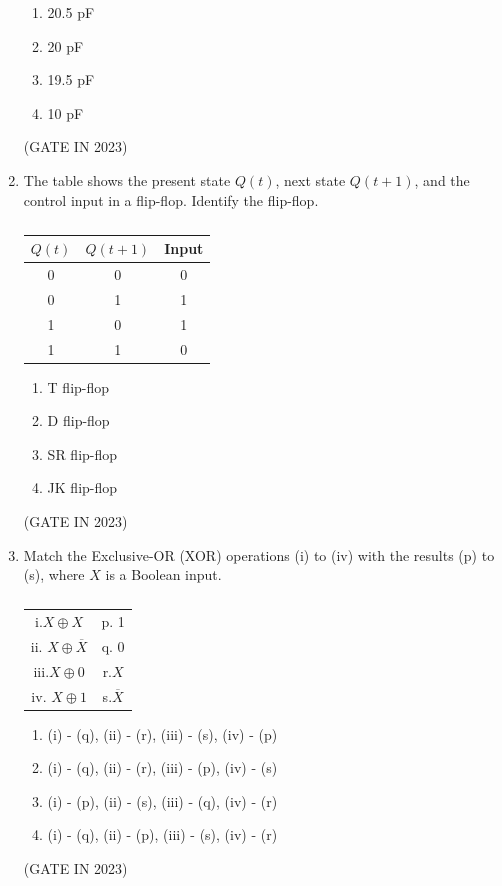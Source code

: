 \documentclass[journal]{IEEEtran}
\begin{document}
\begin{enumerate}
    \begin{enumerate}
        \item 20.5 pF
        \item 20 pF
        \item 19.5 pF
        \item 10 pF
    \end{enumerate}
    \hfill(GATE IN 2023)

    \item The table shows the present state $Q(t)$, next state $Q(t+1)$, and the control input in a flip-flop. Identify the flip-flop.
    \begin{table}[H]
    \begin{tabular}{|c|c|c|}
    \hline
    $Q(t)$ & $Q(t+1)$ & Input \\
    \hline
    0 & 0 & 0 \\
    0 & 1 & 1 \\
    1 & 0 & 1 \\
    1 & 1 & 0 \\
    \hline
    \end{tabular}
    \caption{}
    \label{tab:table1}
    \end{table}
    
    \begin{enumerate}
        \item T flip-flop
        \item D flip-flop
        \item SR flip-flop
        \item JK flip-flop
    \end{enumerate}
    \hfill(GATE IN 2023)

    \item Match the Exclusive-OR (XOR) operations (i) to (iv) with the results (p) to (s), where $X$ is a Boolean input.
    \begin{table}[H]
\begin{tabular}{c c}
i.$X \oplus X$& p. 1 \\
ii. $X \oplus \overline{X}$ & q. 0 \\
iii.$X \oplus 0$ & r.$X$  \\
iv. $X \oplus 1$& s.$\overline{X}$\\
\end{tabular}
\caption{}
\label{tab:matching 2}
\end{table}
    
    \begin{enumerate}
        \item (i) - (q), (ii) - (r), (iii) - (s), (iv) - (p)
        \item (i) - (q), (ii) - (r), (iii) - (p), (iv) - (s)
        \item (i) - (p), (ii) - (s), (iii) - (q), (iv) - (r)
        \item (i) - (q), (ii) - (p), (iii) - (s), (iv) - (r)
    \end{enumerate}
    \hfill(GATE IN 2023)


\end{enumerate}
\end{document}
